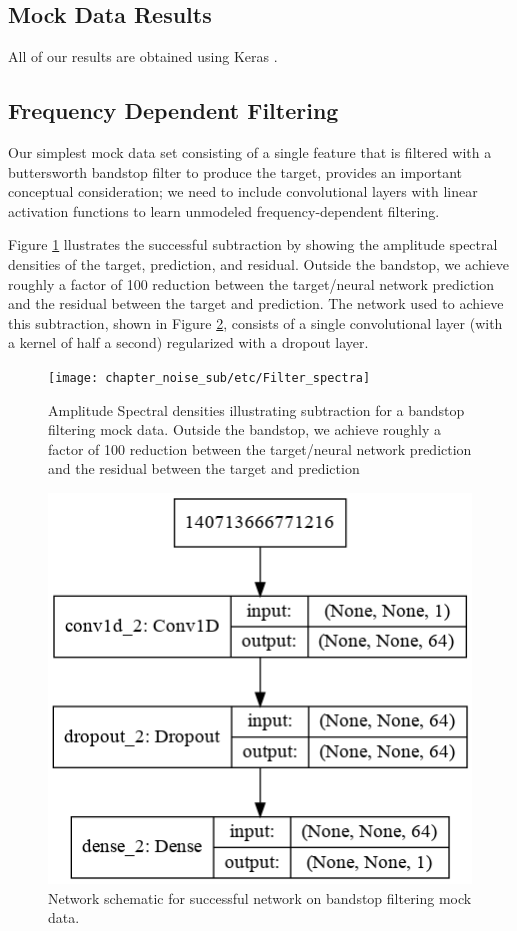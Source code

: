 \begin{refsection}
\section{Mock Data Results}

All of our results are obtained using Keras \cite{chollet2015keras}.

\subsection{Frequency Dependent Filtering}

Our simplest mock data set consisting of a single feature that is filtered with a buttersworth bandstop filter to produce the target, provides an important conceptual consideration; we need to include convolutional layers with linear activation functions to learn unmodeled frequency-dependent filtering. 

Figure \ref{fig:bandstop_ASD} llustrates the successful subtraction by showing the amplitude spectral densities of the target, prediction, and residual. Outside the bandstop, we achieve roughly a factor of 100 reduction between the target/neural network prediction and the residual between the target and prediction.
The network used to achieve this subtraction, shown in Figure \ref{fig:bandstop_net}, consists of a single convolutional layer (with a kernel of half a second) regularized with a dropout layer.

\begin{figure}[htbp]
   \centering
   \texttt{[image: chapter\_noise\_sub/etc/Filter\_spectra]}
   \caption{Amplitude Spectral densities illustrating subtraction for a bandstop filtering mock data. Outside the bandstop, we achieve roughly a factor of 100 reduction between the target/neural network prediction and the residual between the target and prediction}
   \label{fig:bandstop_ASD}
\end{figure}

\begin{figure}[htbp]
   \centering
   \includegraphics[width=0.7\columnwidth]{chapter_noise_sub/etc/bandstop_net}
  \caption{Network schematic for successful network on bandstop filtering mock data.}
   \label{fig:bandstop_net}
\end{figure}


\end{refsection}
